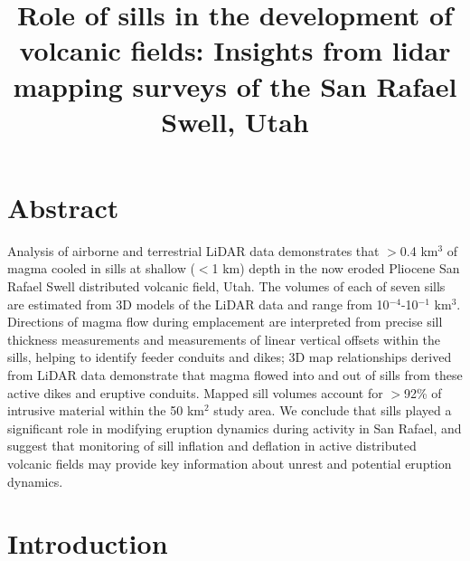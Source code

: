 \documentclass[12pt,letter]{article}
\title{Role of sills in the development of volcanic fields: Insights from lidar mapping surveys of the San Rafael Swell, Utah}
\date{}
\author{}
\begin{document}
\maketitle

\section{Abstract}

Analysis of airborne and terrestrial LiDAR data demonstrates that $>$0.4 km$^3$ of magma cooled in sills at shallow ($<$1 km) depth in the now eroded Pliocene San Rafael Swell distributed volcanic field, Utah. The volumes of each of seven sills are estimated from 3D models of the LiDAR data and range from 10$^{-4}$-10$^{-1}$ km$^3$. Directions of magma flow during emplacement are interpreted from precise sill thickness measurements and measurements of linear vertical offsets within the sills, helping to identify feeder conduits and dikes; 3D map relationships derived from LiDAR data demonstrate that magma flowed into and out of sills from these active dikes and eruptive conduits. Mapped sill volumes account for $>$92\% of intrusive material within the 50 km$^2$ study area. We conclude that sills played a significant role in modifying eruption dynamics during activity in San Rafael, and suggest that monitoring of sill inflation and deflation in active distributed volcanic fields may provide key information about unrest and potential eruption dynamics.


\section{Introduction}
\end{document}
